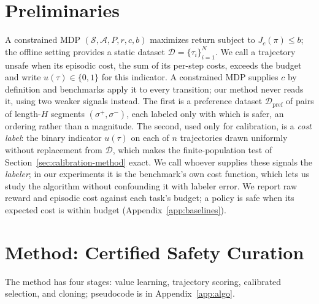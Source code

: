 \documentclass{article} %
\newcommand{\Dpref}{\mathcal{D}_{\mathrm{pref}}}
\newcommand{\Doff}{\mathcal{D}}
\newcommand{\segA}{\sigma^{+}}
\newcommand{\segB}{\sigma^{-}}
\begin{document}
\section{Preliminaries}
\label{sec:prelim}

A constrained MDP $(\mathcal{S}, \mathcal{A}, P, r, c, b)$ maximizes return subject to $J_c(\pi) \le b$; the offline setting provides a static dataset $\Doff = \{\tau_i\}_{i=1}^{N}$. We call a trajectory unsafe when its episodic cost, the sum of its per-step
costs, exceeds the budget and write $u(\tau) \in \{0, 1\}$ for this indicator. A constrained MDP supplies $c$ by definition and benchmarks apply it to every transition; our method never reads it, using two weaker signals instead. The first is a preference dataset $\Dpref$ of pairs of length-$H$ segments $(\segA, \segB)$, each labeled only with which is safer, an ordering rather than a magnitude. The second, used only for calibration, is a \emph{cost label}: the binary indicator $u(\tau)$ on each of $n$ trajectories drawn uniformly without replacement from $\Doff$, which makes the finite-population test of Section~\ref{sec:calibration-method} exact. We call whoever supplies these signals the \emph{labeler}; in our experiments it is the benchmark's own cost function, which lets us study the algorithm without confounding it with labeler error. We report raw reward and episodic cost against each task's budget; a policy is safe when its expected cost is within budget (Appendix~\ref{app:baselines}).

\section{Method: Certified Safety Curation}
\label{sec:method}

The method has four stages: value learning, trajectory scoring, calibrated selection, and cloning; pseudocode is in Appendix~\ref{app:algo}.
\end{document}
